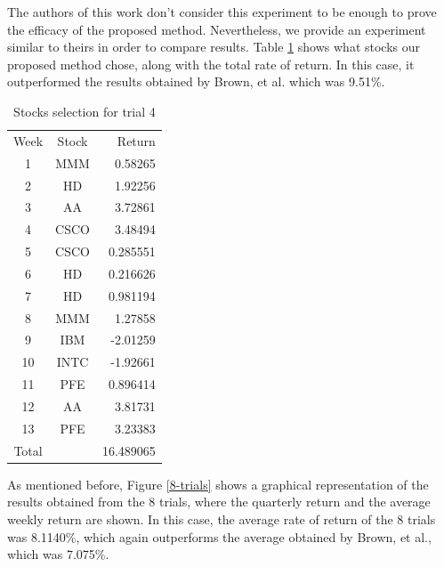 \documentclass[a4paper,twoside]{article}
\begin{document}
The authors of this work don't consider this experiment to be enough
to prove the efficacy of the proposed method. Nevertheless, we provide
an experiment similar to theirs in order to compare results. Table
\ref{best-trial-table} shows what stocks our proposed method chose,
along with the total rate of return. In this case, it outperformed the
results obtained by Brown, et al. which was 9.51\%. 
    
\begin{table}
    \caption{{Stocks selection for trial 4}} 
    \label{best-trial-table}
    \centering
    \begin{tabular}{ c c r }
Week & Stock & Return  \\ 
1 & MMM & 0.58265 \\
2 & HD & 1.92256 \\
3 & AA & 3.72861 \\   
4 & CSCO & 3.48494 \\  
5 & CSCO & 0.285551 \\ 
6 & HD & 0.216626 \\
7 & HD & 0.981194 \\
8 & MMM & 1.27858 \\    
9 & IBM & -2.01259 \\   
10 & INTC & -1.92661 \\ 
11 & PFE & 0.896414 \\  
12 & AA & 3.81731 \\                                
13 & PFE & 3.23383 \\                                                   
Total &  & 16.489065 \\
    \end{tabular}
\end{table}

As mentioned before, Figure \ref{8-trials} shows a graphical
representation of the results obtained from the 8 trials, where the
quarterly return and the average weekly return are shown. In this
case, the average rate of return of the 8 trials was 8.1140\%, which
again outperforms the average obtained by Brown, et al., which was
7.075\%. %


\end{document}

